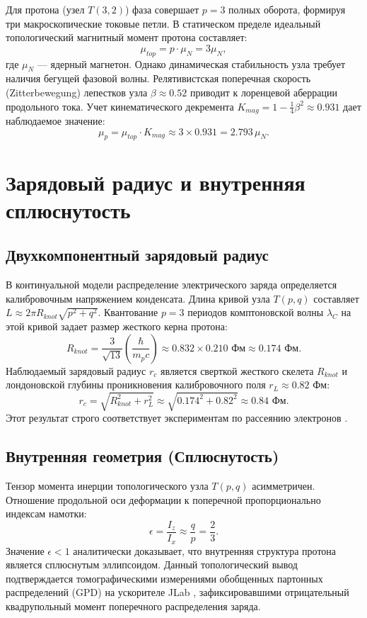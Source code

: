 \documentclass[12pt,a4paper]{article}
\begin{document}
	Для протона (узел $T(3,2)$) фаза совершает $p=3$ полных оборота, формируя три макроскопические токовые петли. В статическом пределе идеальный топологический магнитный момент протона составляет:
	\begin{equation}
		\mu_{top} = p \cdot \mu_N = 3 \mu_N,
	\end{equation}
	где $\mu_N$ — ядерный магнетон. 
	Однако динамическая стабильность узла требует наличия бегущей фазовой волны. Релятивистская поперечная скорость (Zitterbewegung) лепестков узла $\beta \approx 0.52$ приводит к лоренцевой аберрации продольного тока. Учет кинематического декремента $K_{mag} = 1 - \frac{1}{4}\beta^2 \approx 0.931$ дает наблюдаемое значение:
	\begin{equation}
		\mu_{p} = \mu_{top} \cdot K_{mag} \approx 3 \times 0.931 = 2.793 \, \mu_N.
	\end{equation}
	
	\section{Зарядовый радиус и внутренняя сплюснутость}
	
	\subsection{Двухкомпонентный зарядовый радиус}
	В континуальной модели распределение электрического заряда определяется калибровочным напряжением конденсата. Длина кривой узла $T(p,q)$ составляет $L \approx 2\pi R_{knot} \sqrt{p^2+q^2}$. Квантование $p=3$ периодов комптоновской волны $\lambda_C$ на этой кривой задает размер жесткого керна протона:
	\begin{equation}
		R_{knot} = \frac{3}{\sqrt{13}} \left( \frac{\hbar}{m_p c} \right) \approx 0.832 \times 0.210 \text{ Фм} \approx 0.174 \text{ Фм}.
	\end{equation}
	Наблюдаемый зарядовый радиус $r_c$ является сверткой жесткого скелета $R_{knot}$ и лондоновской глубины проникновения калибровочного поля $r_{L} \approx 0.82$ Фм:
	\begin{equation}
		r_c = \sqrt{R_{knot}^2 + r_{L}^2} \approx \sqrt{0.174^2 + 0.82^2} \approx 0.84 \text{ Фм}.
	\end{equation}
	Этот результат строго соответствует экспериментам по рассеянию электронов \cite{nature_radius}.
	
	\subsection{Внутренняя геометрия (Сплюснутость)}
	Тензор момента инерции топологического узла $T(p,q)$ асимметричен. Отношение продольной оси деформации к поперечной пропорционально индексам намотки:
	\begin{equation}
		\epsilon = \frac{I_z}{I_x} \approx \frac{q}{p} = \frac{2}{3}.
	\end{equation}
	Значение $\epsilon < 1$ аналитически доказывает, что внутренняя структура протона является сплюснутым эллипсоидом. Данный топологический вывод подтверждается томографическими измерениями обобщенных партонных распределений (GPD) на ускорителе JLab \cite{jlab_pressure}, зафиксировавшими отрицательный квадрупольный момент поперечного распределения заряда.
	
\end{document}
